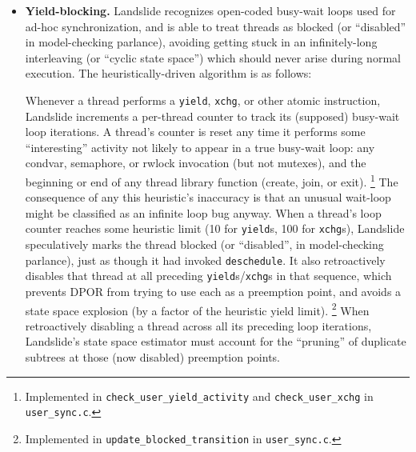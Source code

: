 \begin{itemize}
	\item {\bf Yield-blocking.}
		Landslide recognizes open-coded busy-wait loops used for ad-hoc synchronization,
		and is able to treat threads as blocked (or ``disabled'' in model-checking parlance),
		avoiding getting stuck in an infinitely-long interleaving (or ``cyclic state space'')
		which should never arise during normal execution.
		The heuristically-driven algorithm is as follows:
		\begin{itemize}
			\llitem Whenever a thread performs a {\tt yield}, {\tt xchg}, or other atomic instruction,
				Landslide increments a per-thread counter to track its (supposed) busy-wait loop iterations.
				A thread's counter is reset any time it performs some ``interesting'' activity not likely to appear in a true busy-wait loop:
				any condvar, semaphore, or rwlock invocation (but not mutexes),
				and the beginning or end of any thread library function (create, join, or exit).
				\footnote{Implemented in {\tt check\_user\_yield\_activity} and {\tt check\_user\_xchg} in {\tt user\_sync.c}.}
				The consequence of any this heuristic's inaccuracy is
				that an unusual wait-loop might be classified as an infinite loop bug anyway.
			\llitem When a thread's loop counter reaches some heuristic limit (10 for {\tt yield}s, 100 for {\tt xchg}s),
				Landslide speculatively marks the thread blocked (or ``disabled'', in model-checking parlance),
				just as though it had invoked {\tt deschedule}.
				It also retroactively disables that thread at all preceding {\tt yield}s/{\tt xchg}s in that sequence,
				which prevents DPOR from trying to use each as a preemption point,
				and avoids a state space explosion (by a factor of the heuristic yield limit).
				\footnote{Implemented in {\tt update\_blocked\_transition} in {\tt user\_sync.c}.}
			\llitem When retroactively disabling a thread across all its preceding loop iterations,
				Landslide's state space estimator must account for the ``pruning'' of duplicate subtrees at those (now disabled) preemption points.

\end{itemize}
\end{itemize}
